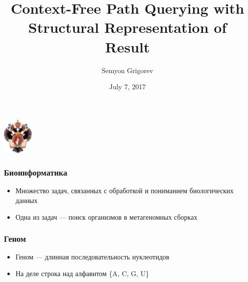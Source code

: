 \documentclass{beamer}
\title[CFPQ with SR]{Context-Free Path Querying with Structural Representation of Result}
\institute[SPbU]{
    Saint-Petersburg University \\
    Programming Languages and Tools Lab JetBrains}
\author[Semyon Grigorev]{Semyon Grigorev}
\date{July 7, 2017}
\begin{document}
    
    
    \begin{frame}
        \begin{center}
            {\includegraphics[width=1.5cm]{pictures/SPbGU_Logo.png}}
        \end{center}
        \titlepage
    \end{frame}
    
    \begin{frame}
        \frametitle{Биоинформатика}
        \begin{itemize}
            \item Множество задач, связанных с обработкой и пониманием биологических данных
            \item Одна из задач --- поиск организмов в метагеномных сборках
        \end{itemize}
    \end{frame}
    
    \begin{frame}
        \frametitle{Геном}
        \begin{itemize}
            \item Геном --- длинная последовательность нуклеотидов
            \item На деле строка над алфавитом \{A, C, G, U\}
        \end{itemize}
    \end{frame}
    
\end{document}
